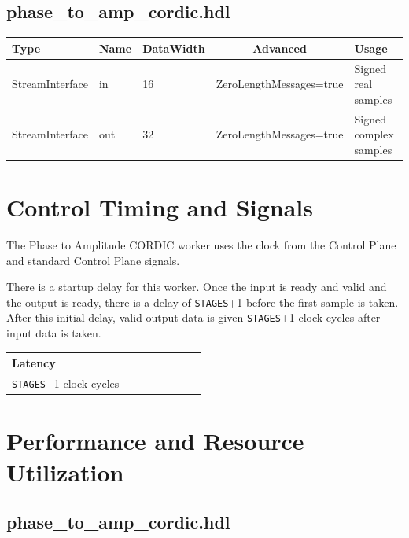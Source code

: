 \documentclass{article}
\def\comp{phase\_to\_amp\_cordic}
\edef\ecomp{phase_to_amp_cordic}
\begin{document}
\begin{landscape}
	\subsection*{\comp.hdl}
	\begin{scriptsize}
		\begin{tabular}{|M{2cm}|M{1.5cm}|M{4cm}|c|M{10cm}|}
			\hline
			Type            & Name & DataWidth & Advanced                & Usage                  \\
			\hline
			StreamInterface & in   & 16        & ZeroLengthMessages=true & Signed real samples    \\
			\hline
			StreamInterface & out  & 32        & ZeroLengthMessages=true & Signed complex samples \\
			\hline
		\end{tabular}
	\end{scriptsize}
\end{landscape}

\section*{Control Timing and Signals}
\begin{flushleft}
	The Phase to Amplitude CORDIC worker uses the clock from the Control Plane and standard Control Plane signals.\medskip

	There is a startup delay for this worker. Once the input is ready and valid and the output is ready, there is a delay of \verb+STAGES++1 before the first sample is taken. After this initial delay, valid output data is given \verb+STAGES++1 clock cycles after input data is taken.

	\begin{tabular}{|M{4.5cm}|M{1cm}|M{1cm}|M{1.5cm}|M{2cm}|M{1cm}|M{1cm}|M{2.5cm}|}
		\hline
		Latency                      \\
		\hline
		\verb+STAGES++1 clock cycles \\
		\hline
	\end{tabular}
\end{flushleft}

\section*{Performance and Resource Utilization}
\subsection*{\comp.hdl}

\newpage
\end{document}
